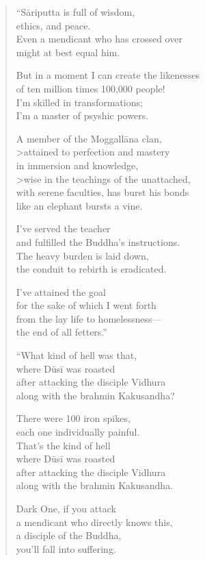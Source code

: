 \documentclass[12pt,openany]{book}%
\begin{document}
\begin{verse}
“\textsanskrit{Sāriputta} is full of wisdom, \\
ethics, and peace. \\
Even a mendicant who has crossed over \\
might at best equal him. 

But in a moment I can create the likenesses \\
of ten million times 100,000 people! \\
I’m skilled in transformations; \\
I’m a master of psyshic powers. 

A member of the \textsanskrit{Moggallāna} clan, \\>attained to perfection and mastery \\
in immersion and knowledge, \\>wise in the teachings of the unattached, \\
with serene faculties, has burst his bonds \\
like an elephant bursts a vine. 

I’ve served the teacher \\
and fulfilled the Buddha’s instructions. \\
The heavy burden is laid down, \\
the conduit to rebirth is eradicated. 

I’ve attained the goal \\
for the sake of which I went forth \\
from the lay life to homelessness—\\
the end of all fetters.” 

“What kind of hell was that, \\
where \textsanskrit{Dūsī} was roasted \\
after attacking the disciple Vidhura \\
along with the brahmin Kakusandha? 

There were 100 iron spikes, \\
each one individually painful. \\
That’s the kind of hell \\
where \textsanskrit{Dūsī} was roasted \\
after attacking the disciple Vidhura \\
along with the brahmin Kakusandha. 

Dark One, if you attack \\
a mendicant who directly knows this, \\
a disciple of the Buddha, \\
you’ll fall into suffering. 


\end{verse}
\end{document}
